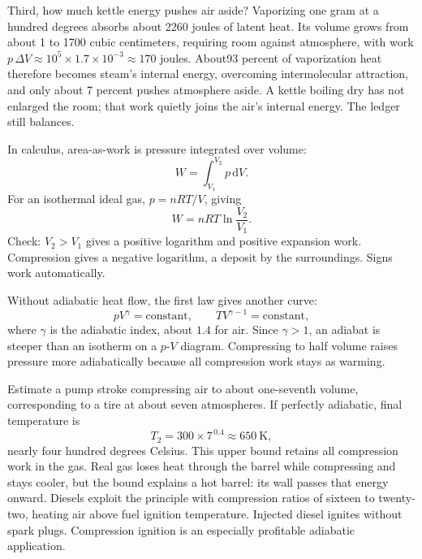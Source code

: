 \begin{mainline}
Third, how much kettle energy pushes air aside? Vaporizing one gram at a hundred degrees absorbs about 2260 joules of latent heat. Its volume grows from about 1 to 1700 cubic centimeters, requiring room against atmosphere, with work \(p\,\Delta V\approx10^{5}\times1.7\times10^{-3}\approx170\) joules. About93 percent of vaporization heat therefore becomes steam's internal energy, overcoming intermolecular attraction, and only about 7 percent pushes atmosphere aside. A kettle boiling dry has not enlarged the room; that work quietly joins the air's internal energy. The ledger still balances.
\end{mainline}

\begin{mathbridge}
In calculus, area-as-work is pressure integrated over volume:
\[
  W=\int_{V_1}^{V_2} p\,\mathrm{d}V .
\]
For an isothermal ideal gas, \(p=nRT/V\), giving
\[
  W=nRT\ln\frac{V_2}{V_1}.
\]
Check: \(V_2>V_1\) gives a positive logarithm and positive expansion work. Compression gives a negative logarithm, a deposit by the surroundings. Signs work automatically.

Without adiabatic heat flow, the first law gives another curve:
\[
  pV^{\gamma}=\text{constant},\qquad TV^{\gamma-1}=\text{constant},
\]
where \(\gamma\) is the adiabatic index, about \(1.4\) for air. Since \(\gamma>1\), an adiabat is steeper than an isotherm on a \(p\)-\(V\) diagram. Compressing to half volume raises pressure more adiabatically because all compression work stays as warming.

Estimate a pump stroke compressing air to about one-seventh volume, corresponding to a tire at about seven atmospheres. If perfectly adiabatic, final temperature is
\[
  T_2=300\times 7^{\,0.4}\approx 650\ \mathrm{K},
\]
nearly four hundred degrees Celsius. This upper bound retains all compression work in the gas. Real gas loses heat through the barrel while compressing and stays cooler, but the bound explains a hot barrel: its wall passes that energy onward. Diesels exploit the principle with compression ratios of sixteen to twenty-two, heating air above fuel ignition temperature. Injected diesel ignites without spark plugs. Compression ignition is an especially profitable adiabatic application.
\end{mathbridge}

